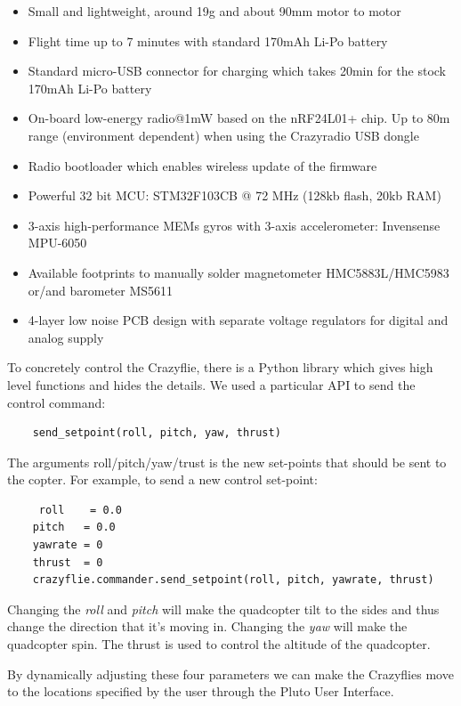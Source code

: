 \begin{itemize}
\item {Small and lightweight, around 19g and about 90mm motor to motor
}
\item {Flight time up to 7 minutes with standard 170mAh Li-Po battery
}
\item {Standard micro-USB connector for charging which takes 20min for the stock 170mAh Li-Po battery
}
\item {On-board low-energy radio@1mW based on the nRF24L01+ chip. Up to 80m range (environment dependent) when using the Crazyradio USB dongle}
\item{Radio bootloader which enables wireless update of the firmware
}
\item{Powerful 32 bit MCU: STM32F103CB @ 72 MHz (128kb flash, 20kb RAM)
}
\item{3-axis high-performance MEMs gyros with 3-axis accelerometer: Invensense MPU-6050
}
\item{Available footprints to manually solder magnetometer HMC5883L/HMC5983 or/and barometer MS5611
}
\item{4-layer low noise PCB design with separate voltage regulators for digital and analog supply
}
\end{itemize}

To concretely control the Crazyflie, there is a Python library which gives high level functions and hides the details.
We used a particular API to send the control command: 
\\

\begin{lstlisting}
	send_setpoint(roll, pitch, yaw, thrust)
\end{lstlisting}

The arguments roll/pitch/yaw/trust is the new set-points that should be sent to the copter.
For example, to send a new control set-point:
\\

\begin{lstlisting}
	 roll    = 0.0
    pitch   = 0.0
    yawrate = 0
    thrust  = 0
    crazyflie.commander.send_setpoint(roll, pitch, yawrate, thrust)
\end{lstlisting}

Changing the \textit{roll} and \textit{pitch} will make the quadcopter tilt to the sides and thus change the direction that it's moving in.
Changing the \textit{yaw} will make the quadcopter spin.
The thrust is used to control the altitude of the quadcopter.

By dynamically adjusting these four parameters we can make the Crazyflies move to the locations specified by the user through the Pluto User Interface.


